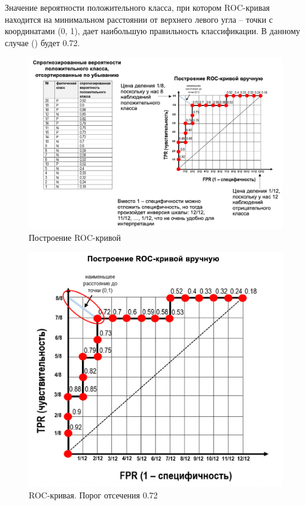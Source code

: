 \documentclass[%
	11pt,
	a4paper,
	utf8,
		]{article}
\begin{document}
Значение вероятности положительного класса, при котором ROC-кривая находится на минимальном расстоянии от верхнего левого угла -- точки с координатами (0, 1), дает наибольшую правильность классификации. В данному случае () будет 0.72.

\begin{figure}[h]
	\centering
	\includegraphics[scale=0.3]{figures/roc_auc0.png}
	\caption{ Построение ROC-кривой }\label{fig:roc_auc0}
\end{figure}

\begin{figure}[h]
	\centering
	\includegraphics[scale=0.3]{figures/roc_auc0-1.png}
	\caption{ ROC-кривая. Порог отсечения 0.72 }\label{fig:roc_auc0-1}
\end{figure}
\end{document}
